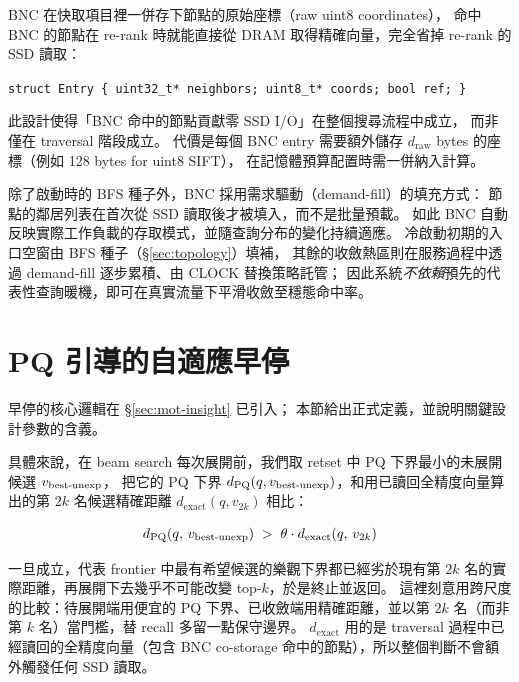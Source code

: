 BNC 在快取項目裡一併存下節點的原始座標（raw uint8 coordinates），
命中 BNC 的節點在 re-rank 時就能直接從 DRAM 取得精確向量，完全省掉 re-rank 的 SSD 讀取：

\begin{center}
\texttt{struct Entry \{ uint32\_t* neighbors;\ uint8\_t* coords;\ bool ref; \}}
\end{center}

此設計使得「BNC 命中的節點貢獻零 SSD I/O」在整個搜尋流程中成立，
而非僅在 traversal 階段成立。
代價是每個 BNC entry 需要額外儲存 $d_\text{raw}$ bytes 的座標（例如 128 bytes for uint8 SIFT），
在記憶體預算配置時需一併納入計算。

除了啟動時的 BFS 種子外，BNC 採用需求驅動（demand-fill）的填充方式：
節點的鄰居列表在首次從 SSD 讀取後才被填入，而不是批量預載。
如此 BNC 自動反映實際工作負載的存取模式，並隨查詢分布的變化持續適應。
冷啟動初期的入口空窗由 BFS 種子（§\ref{sec:topology}）填補，
其餘的收斂熱區則在服務過程中透過 demand-fill 逐步累積、由 CLOCK 替換策略託管；
因此系統\emph{不依賴}預先的代表性查詢暖機，即可在真實流量下平滑收斂至穩態命中率。

\section{PQ 引導的自適應早停}
\label{sec:et}

早停的核心邏輯在 §\ref{sec:mot-insight} 已引入；
本節給出正式定義，並說明關鍵設計參數的含義。

具體來說，在 beam search 每次展開前，我們取 retset 中 PQ 下界最小的未展開候選 $v_\text{best\text{-}unexp}$，
把它的 PQ 下界 $d_\text{PQ}(q, v_\text{best\text{-}unexp})$，和用已讀回全精度向量算出的第 $2k$ 名候選精確距離 $d_\text{exact}(q, v_{2k})$ 相比：

\begin{equation}
  d_\text{PQ}(q,\, v_\text{best\text{-}unexp}) \;>\; \theta \cdot d_\text{exact}(q,\, v_{2k})
  \label{eq:et-gate}
\end{equation}

一旦成立，代表 frontier 中最有希望候選的樂觀下界都已經劣於現有第 $2k$ 名的實際距離，再展開下去幾乎不可能改變 top-$k$，於是終止並返回。
這裡刻意用跨尺度的比較：待展開端用便宜的 PQ 下界、已收斂端用精確距離，並以第 $2k$ 名（而非第 $k$ 名）當門檻，替 recall 多留一點保守邊界。
$d_\text{exact}$ 用的是 traversal 過程中已經讀回的全精度向量（包含 BNC co-storage 命中的節點），所以整個判斷不會額外觸發任何 SSD 讀取。

